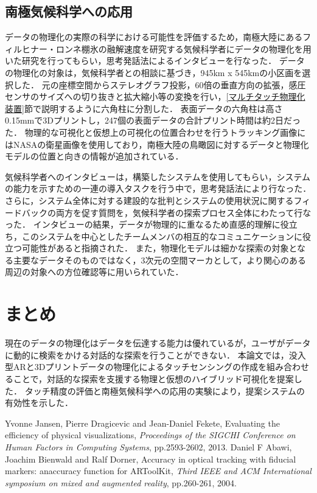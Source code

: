 \documentclass[a4paper,10pt,twocolumn,uplatex]{jsarticle}
\begin{document}
\subsection{南極気候科学への応用}
データの物理化の実際の科学における可能性を評価するため，南極大陸にあるフィルヒナー・ロンネ棚氷の融解速度を研究する気候科学者にデータの物理化を用いた研究を行ってもらい，思考発話法によるインタビューを行なった．
データの物理化の対象は，気候科学者との相談に基づき，945km x 545kmの小区画を選択した．
元の座標空間からステレオグラフ投影，60倍の垂直方向の拡張，感圧センサのサイズへの切り抜きと拡大縮小等の変換を行い，\ref{マルチタッチ物理化装置}節で説明するように六角柱に分割した．
表面データの六角柱は高さ0.15mmで3Dプリントし，247個の表面データの合計プリント時間は約2日だった．
物理的な可視化と仮想上の可視化の位置合わせを行うトラッキング画像にはNASAの衛星画像を使用しており，南極大陸の鳥瞰図に対するデータと物理化モデルの位置と向きの情報が追加されている．\par
気候科学者へのインタビューは，構築したシステムを使用してもらい，システムの能力を示すための一連の導入タスクを行う中で，思考発話法により行なった．
さらに，システム全体に対する建設的な批判とシステムの使用状況に関するフィードバックの両方を促す質問を，気候科学者の探索プロセス全体にわたって行なった．
インタビューの結果，データが物理的に重なるため直感的理解に役立ち，このシステムを中心としたチームメンバの相互的なコミュニケーションに役立つ可能性があると指摘された．
また，物理化モデルは細かな探索の対象となる主要なデータそのものではなく，3次元の空間マーカとして，より関心のある周辺の対象への方位確認等に用いられていた．

\section{まとめ}
現在のデータの物理化はデータを伝達する能力は優れているが，ユーザがデータに動的に検索をかける対話的な探索を行うことができない．
本論文では，没入型ARと3Dプリントデータの物理化によるタッチセンシングの作成を組み合わせることで，対話的な探索を支援する物理と仮想のハイブリッド可視化を提案した．
タッチ精度の評価と南極気候科学への応用の実験により，提案システムの有効性を示した．

\footnotesize{
  \begin{thebibliography}{99}
     Yvonne Jansen, Pierre Dragicevic and Jean-Daniel Fekete, Evaluating the efficiency of physical visualizations, \textit{Proceedings of the SIGCHI Conference on Human Factors in Computing Systems}, pp.2593-2602, 2013.
     Daniel F Abawi, Joachim Bienwald and Ralf Dorner, Accuracy in optical tracking with fiducial markers: anaccuracy function for ARToolKit, \textit{Third IEEE and ACM International symposium on mixed and augmented reality}, pp.260-261, 2004.
  \end{thebibliography}
}

% 
% 

\end{document}
